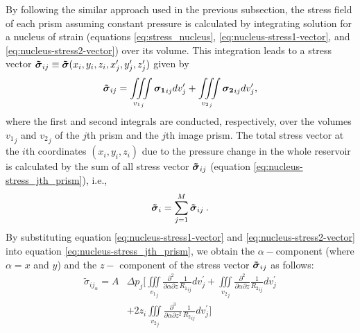 \documentclass[P]{BrJG_submit}
\begin{document}
By following the similar approach used in the previous subsection, the stress field of each prism assuming constant pressure is calculated by integrating solution for a 
nucleus of strain (equations \ref{eq:stress_nucleus}, \ref{eq:nucleus-stress1-vector},
and \ref{eq:nucleus-stress2-vector}) over its volume. 
This integration leads to a stress vector 
$\mbox{\boldmath$\tilde{\sigma}$}_{ij} \equiv \mbox{\boldmath$\tilde{\sigma}$}(x_{i}, y_{i}, z_{i}, x^{\prime}_{j}, y^{\prime}_{j}, z^{\prime}_{j})$ given by
\begin{equation}
\mbox{\boldmath$\tilde{\sigma}$}_{ij} = 
\iiint\limits_{{v_{1}}_{j}}
\mbox{\boldmath$\sigma_{1}$}_{ij} dv_{j}^{\prime}
+ 
\iiint\limits_{{v_{2}}_{j}}
\mbox{\boldmath$\sigma_{2}$}_{ij} dv_{j}^{\prime},
\label{eq:nucleus-stress_jth_prism}
\end{equation}
where the first and second integrals are conducted, respectively, over the volumes 
${v_{1}}_{j}$ and ${v_{2}}_{j}$ of the $j$th prism and the $j$th image prism.
The total stress vector at the $i$th coordinates  $(x_i, y_i, z_i)$ due to the pressure change in the whole reservoir is calculated by the sum of all stress vector $\mbox{\boldmath$\tilde{\sigma}$}_{ij}$ (equation \ref{eq:nucleus-stress_jth_prism}), i.e., 
\begin{equation}
\mbox{\boldmath$\tilde{\sigma}$}_{i} = 
\sum_{j=1}^{M} \mbox{\boldmath$\tilde{\sigma}$}_{ij} \: .
\label{eq:nucleus-stress_M_prisms}
\end{equation}
By substituting equation \ref{eq:nucleus-stress1-vector} and 
\ref{eq:nucleus-stress2-vector} into equation \ref{eq:nucleus-stress_jth_prism}, 
we obtain the $\alpha-$component (where  $\alpha = x$ and $y$) and the $z-$ component 
of the stress vector $\mbox{\boldmath$\tilde{\sigma}$}_{ij}$ as follows:
\begin{equation}
\begin{aligned}
{\tilde{\sigma}}_{{ij}_\alpha} \! = \! A  
& \Delta p_{j} \! \Bigg[
\iiint\limits_{{v_{1}}_{j}} \!\!
\frac{\partial^{2}}{\partial \alpha \partial z} {\frac{1}{{R_1}_{ij}}}  dv_{j}^{\prime}
\! +  \!  \iiint\limits_{{v_{2}}_{j}}
\frac{\partial^{2} }{\partial \alpha \partial z} {\frac{1}{{R_2}_{ij}}} dv_{j}^{\prime} \\
& +  2  z_{i} \iiint\limits_{{v_{2}}_{j}}
\frac{\partial^{3}}{\partial \alpha \partial z ^{2}} {\frac{1}{{R_2}_{ij}}}  dv_{j}^{\prime} \Bigg]
\end{aligned}
\label{eq:stress_til_alpha}
\end{equation}
\end{document}
